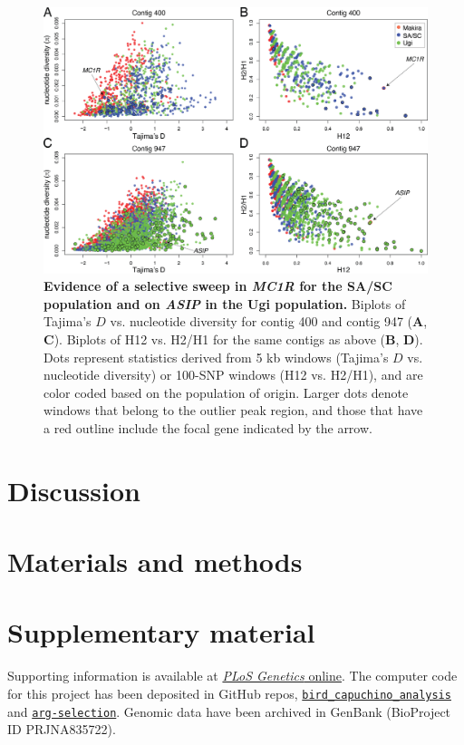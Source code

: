 \begin{figure}[h]
    \centering
    \includegraphics[width=\textwidth]{monarcha_figs/mon_F3.PNG}
    \caption[Evidence of a selective sweep in \textit{MC1R} for the \ac{SA/SC} population and on \textit{ASIP} in the Ugi population.]{\textbf{Evidence of a selective sweep in \textit{MC1R} for the \ac{SA/SC} population and on \textit{ASIP} in the Ugi population.} Biplots of Tajima’s $D$ vs. nucleotide diversity for contig 400 and contig 947 (\textbf{A}, \textbf{C}). Biplots of H12 vs. H2/H1 for the same contigs as above (\textbf{B}, \textbf{D}). Dots represent statistics derived from 5 kb windows (Tajima’s $D$ vs. nucleotide diversity) or 100-\acs{SNP} windows (H12 vs. H2/H1), and are color coded based on the population of origin. Larger dots denote windows that belong to the outlier peak region, and those that have a red outline include the focal gene indicated by the arrow.}
    \label{fig:mon-F3}
\end{figure}

\section{Discussion}

\section{Materials and methods}

\section{Supplementary material}
Supporting information is available at \href{https://journals.plos.org/PLOSGENETICS/article?id=10.1371/journal.pgen.1010474#sec017}{\textit{PLoS Genetics} online}. The computer code for this project has been deposited in GitHub repos, \href{https://github.com/CshlSiepelLab/bird_capuchino_analysis}{\texttt{bird\_capuchino\_analysis}} and \href{https://github.com/CshlSiepelLab/arg-selection}{\texttt{arg-selection}}. Genomic data have been archived in GenBank (BioProject ID PRJNA835722).